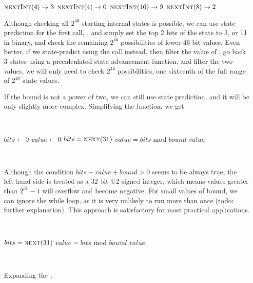 \documentclass{article}
\begin{document}
\begin{algorithmic}
    \State $\Call{nextInt}{4} \to 3$
    \State $\Call{nextInt}{4} \to 0$
    \State $\Call{nextInt}{16} \to 9$
    \State $\Call{nextInt}{8} \to 2$\\
\end{algorithmic}

\noindent Although checking all $2^{48}$ starting internal states is possible, we can use state prediction for the first call, , and simply set the top 2 bits of the state to 3, or 11 in binary, and check the remaining $2^{46}$ possibilities of lower 46 bit values. 
Even better, if we state-predict using the  call instead, then filter the value of , go back 3 states using a precalculated state advancement function, and filter the two  values, we will only need to check $2^{44}$ possibilities, one sixteenth of the full range of $2^{48}$ state values. %

If the  bound is not a power of two, we can still use state prediction, and it will be only slightly more complex. Simplifying the  function, we get

\
\begin{algorithmic}
    \State $bits \gets 0$
    \State $value \gets 0$
        \State $bits = \Call{next}{31}$
        \State $value = bits$ mod $bound$
    \EndWhile
    \State \Return $value$
\EndFunction
\end{algorithmic}
\ \

Although the condition $bits - value + bound > 0$ seems to be always true, the left-hand-side is treated as a 32-bit U2 signed integer, which means values greater than $2^{31} - 1$ will overflow and become negative. For small values of bound, we can ignore the while loop, as it is very unlikely to run more than once (todo: further explanation). This approach is satisfactory for most practical applications. 

\
\begin{algorithmic}
\Function{nextInt}{$bound$}
    \State $bits = \Call{next}{31}$
    \State $value = bits$ mod $bound$
    \State \Return $value$
\EndFunction
\end{algorithmic}
\ \

\noindent Expanding the ,
\end{document}
